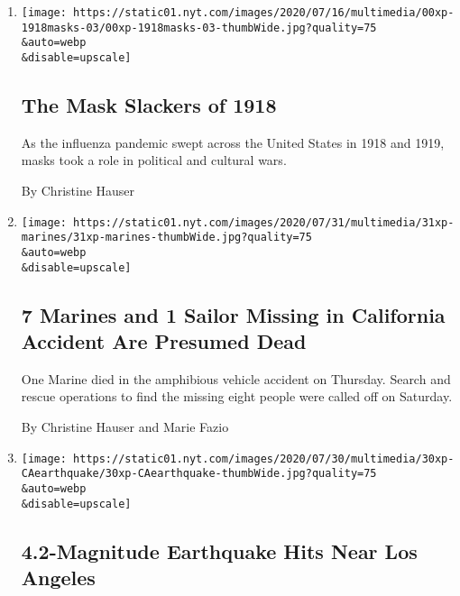 \begin{enumerate}
\def\labelenumi{\arabic{enumi}.}
\item
  \href{/2020/08/03/us/mask-protests-1918.html}{}

  \texttt{[image: https://static01.nyt.com/images/2020/07/16/multimedia/00xp-1918masks-03/00xp-1918masks-03-thumbWide.jpg?quality=75\\\&auto=webp\\\&disable=upscale]}

  \hypertarget{the-mask-slackers-of-1918}{%
  \subsection{The Mask Slackers of
  1918}\label{the-mask-slackers-of-1918}}

  As the influenza pandemic swept across the United States in 1918 and
  1919, masks took a role in political and cultural wars.

  By Christine Hauser
\item
  \href{/2020/07/31/us/marine-accident-california.html}{}

  \texttt{[image: https://static01.nyt.com/images/2020/07/31/multimedia/31xp-marines/31xp-marines-thumbWide.jpg?quality=75\\\&auto=webp\\\&disable=upscale]}

  \hypertarget{7-marines-and-1-sailor-missing-in-california-accident-are-presumed-dead}{%
  \subsection{7 Marines and 1 Sailor Missing in California Accident Are
  Presumed
  Dead}\label{7-marines-and-1-sailor-missing-in-california-accident-are-presumed-dead}}

  One Marine died in the amphibious vehicle accident on Thursday. Search
  and rescue operations to find the missing eight people were called off
  on Saturday.

  By Christine Hauser and Marie Fazio
\item
  \href{/2020/07/30/us/california-earthquake.html}{}

  \texttt{[image: https://static01.nyt.com/images/2020/07/30/multimedia/30xp-CAearthquake/30xp-CAearthquake-thumbWide.jpg?quality=75\\\&auto=webp\\\&disable=upscale]}

  \hypertarget{42-magnitude-earthquake-hits-near-los-angeles}{%
  \subsection{4.2-Magnitude Earthquake Hits Near Los
  Angeles}\label{42-magnitude-earthquake-hits-near-los-angeles}}


\end{enumerate}

